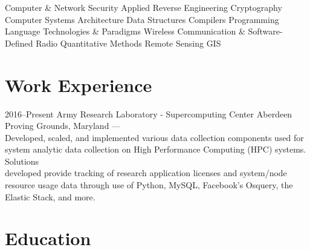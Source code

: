 \documentclass[print]{friggeri-cv} %
\begin{document}
\begin{aside}
Computer \& Network \hspace*{.2cm} Security
Applied Reverse \hspace*{.2cm} Engineering
Cryptography
Computer Systems \hspace*{.2cm} Architecture
Data Structures
Compilers
Programming Language \hspace*{.2cm} Technologies \& Paradigms
Wireless Communication \& \hspace*{.2cm} Software-Defined Radio
Quantitative Methods
Remote Sensing
GIS

\end{aside}


\section{Work Experience}

\begin{entrylist}


\entry
{2016--Present}
{Army Research Laboratory - Supercomputing Center}
{Aberdeen Proving Grounds, Maryland}
{---\\Developed, scaled, and implemented various data collection components used for system analytic data collection on High Performance Computing (HPC) systems. Solutions \\ developed provide tracking of research application licenses and system/node resource usage data through use of Python, MySQL, Facebook’s Osquery, the Elastic Stack, and more.}


\end{entrylist}


\section{Education}
\end{document}
